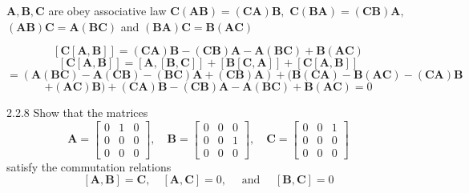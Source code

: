\documentclass{article}
\begin{document}
\begin{flushleft}
$\mathbf{A}, \mathbf{B}, \mathbf{C}$ are obey associative law $ \mathbf{C}(\mathbf{A} \mathbf{B})=(\mathbf{C} \mathbf{A}) \mathbf{B},$ $\mathbf{C}(\mathbf{B} \mathbf{A})=(\mathbf{C} \mathbf{B}) \mathbf{A},$ $(\mathbf{A} \mathbf{B}) \mathbf{C}=\mathbf{A}(\mathbf{B} \mathbf{C})$ and $(\mathbf{B} \mathbf{A}) \mathbf{C}=\mathbf{B}(\mathbf{A} \mathbf{C})$


$$[\mathbf{C}[\mathbf{A}, \mathbf{B}]]=(\mathbf{C} \mathbf{A}) \mathbf{B}-(\mathbf{C} \mathbf{B}) \mathbf{A}-\mathbf{A}(\mathbf{B} \mathbf{C})+\mathbf{B}(\mathbf{A} \mathbf{C})$$
$$[\mathbf{C}[\mathbf{A}, \mathbf{B}]]=[\mathbf{A},[\mathbf{B}, \mathbf{C}]]+[\mathbf{B}[\mathbf{C}, \mathbf{A}]]+[\mathbf{C}[\mathbf{A}, \mathbf{B}]] $$
$$=(\mathbf{A}(\mathbf{B} \mathbf{C})-\mathbf{A}(\mathbf{C} \mathbf{B})-(\mathbf{B} \mathbf{C}) \mathbf{A}+(\mathbf{C} \mathbf{B}) \mathbf{A})+(\mathbf{B}(\mathbf{C} \mathbf{A})-\mathbf{B}(\mathbf{A} \mathbf{C})-(\mathbf{C} \mathbf{A}) \mathbf{B} $$
$$+(\mathbf{A} \mathbf{C}) \mathbf{B})+(\mathbf{C} \mathbf{A}) \mathbf{B}-(\mathbf{C} \mathbf{B}) \mathbf{A}-\mathbf{A}(\mathbf{B} \mathbf{C})+\mathbf{B}(\mathbf{A} \mathbf{C})=0$$


\newpage

\begin{mybox}{2.2.8}
Show that the matrices
$$\mathbf{A}=\begin{bmatrix}{0} & {1} & {0} \\ {0} & {0} & {0} \\ {0} & {0} & {0}\end{bmatrix}, \quad \mathbf{B}=\begin{bmatrix}{0} & {0} & {0} \\ {0} & {0} & {1} \\ {0} & {0} & {0}\end{bmatrix}, \quad \mathbf{C}=\begin{bmatrix}{0} & {0} & {1} \\ {0} & {0} & {0} \\ {0} & {0} & {0}\end{bmatrix}$$
satisfy the commutation relations
$$
[\mathbf{A}, \mathbf{B}]=\mathbf{C}, \quad[\mathbf{A}, \mathbf{C}]=0, \quad \text { and } \quad[\mathbf{B}, \mathbf{C}]=0
$$
\end{mybox}



\end{flushleft}
\end{document}
